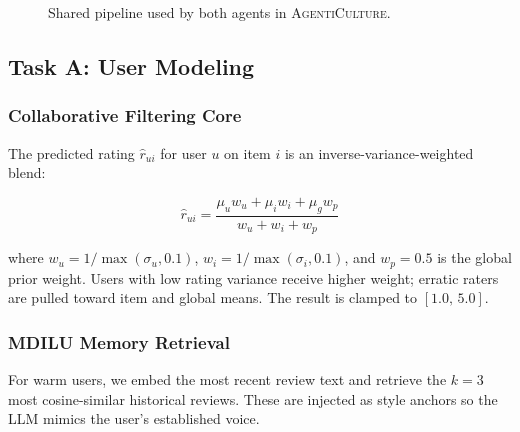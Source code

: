 \documentclass[11pt]{article}
\newcommand{\system}{\textsc{AgentiCulture}\xspace}
\begin{document}
\begin{figure}[t]
{%
  }
  \caption{Shared pipeline used by both agents in \system.}
  \label{fig:pipeline}
\end{figure}

\subsection{Task A: User Modeling}

\subsubsection{Collaborative Filtering Core}
The predicted rating $\hat{r}_{ui}$ for user $u$ on item $i$ is an inverse-variance-weighted blend:

\begin{equation}
\hat{r}_{ui} = \frac{\mu_u w_u + \mu_i w_i + \mu_g w_p}{w_u + w_i + w_p}
\label{eq:cf}
\end{equation}

where $w_u = 1/\max(\sigma_u, 0.1)$, $w_i = 1/\max(\sigma_i, 0.1)$, and $w_p = 0.5$ is the global prior weight. Users with low rating variance receive higher weight; erratic raters are pulled toward item and global means. The result is clamped to $[1.0,\, 5.0]$.

\subsubsection{MDILU Memory Retrieval}
For warm users, we embed the most recent review text and retrieve the $k=3$ most cosine-similar historical reviews. These are injected as style anchors so the LLM mimics the user's established voice.
\end{document}
